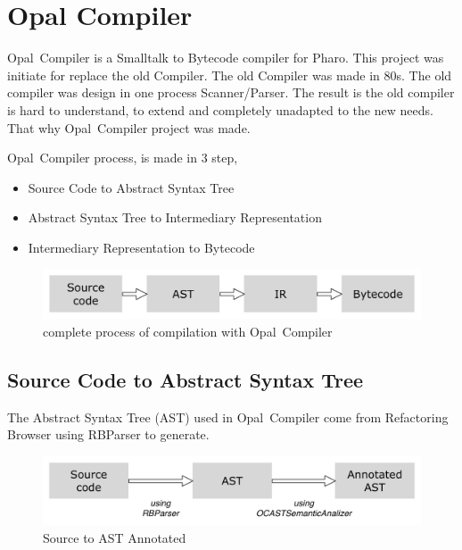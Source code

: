 \documentclass[a4paper,10pt,twoside]{book}
\begin{document}
	\renewcommand{\nnbb}[2]{} %
	\sloppy
\fi


\newcommand{\opal}[0]{Opal~Compiler } %
\chapter{Opal Compiler} 


\opal is a Smalltalk to Bytecode compiler for Pharo. This project was initiate for replace the old Compiler. The old Compiler was made in 80s. The old compiler was design in one process Scanner/Parser. The result is the old compiler is hard to understand, to extend and completely unadapted to the new needs. That why \opal project was made.

\opal process, is made in 3 step,
\begin{itemize}
\item Source Code to Abstract Syntax Tree
\item Abstract Syntax Tree to Intermediary Representation
\item Intermediary Representation to Bytecode
\end{itemize}

\begin{figure}[ht]\centering
	\includegraphics[width=\linewidth]{fullProcess}
	\caption{complete process of compilation with \opal {}}
\end{figure}

\section{Source Code to Abstract Syntax Tree}
The Abstract Syntax Tree (AST) used in \opal come from Refactoring Browser using RBParser to generate. 
\begin{figure}[ht]\centering
	\includegraphics[width=\linewidth]{SourceToAnnotatedAST}
	\caption{Source to AST Annotated }
\end{figure}
\end{document}
